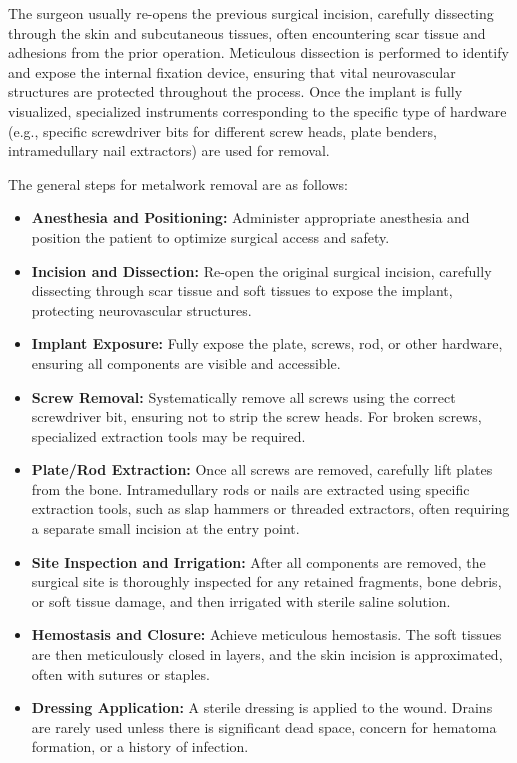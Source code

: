 The surgeon usually re-opens the previous surgical incision, carefully dissecting through the skin and subcutaneous tissues, often encountering scar tissue and adhesions from the prior operation. Meticulous dissection is performed to identify and expose the internal fixation device, ensuring that vital neurovascular structures are protected throughout the process. Once the implant is fully visualized, specialized instruments corresponding to the specific type of hardware (e.g., specific screwdriver bits for different screw heads, plate benders, intramedullary nail extractors) are used for removal.

The general steps for metalwork removal are as follows:
\begin{itemize}
  \item \textbf{Anesthesia and Positioning:} Administer appropriate anesthesia and position the patient to optimize surgical access and safety.
  \item \textbf{Incision and Dissection:} Re-open the original surgical incision, carefully dissecting through scar tissue and soft tissues to expose the implant, protecting neurovascular structures.
  \item \textbf{Implant Exposure:} Fully expose the plate, screws, rod, or other hardware, ensuring all components are visible and accessible.
  \item \textbf{Screw Removal:} Systematically remove all screws using the correct screwdriver bit, ensuring not to strip the screw heads. For broken screws, specialized extraction tools may be required.
  \item \textbf{Plate/Rod Extraction:} Once all screws are removed, carefully lift plates from the bone. Intramedullary rods or nails are extracted using specific extraction tools, such as slap hammers or threaded extractors, often requiring a separate small incision at the entry point.
  \item \textbf{Site Inspection and Irrigation:} After all components are removed, the surgical site is thoroughly inspected for any retained fragments, bone debris, or soft tissue damage, and then irrigated with sterile saline solution.
  \item \textbf{Hemostasis and Closure:} Achieve meticulous hemostasis. The soft tissues are then meticulously closed in layers, and the skin incision is approximated, often with sutures or staples.
  \item \textbf{Dressing Application:} A sterile dressing is applied to the wound. Drains are rarely used unless there is significant dead space, concern for hematoma formation, or a history of infection.
\end{itemize}

